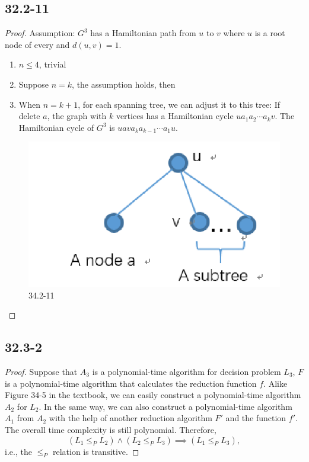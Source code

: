 \documentclass[twocolumn, 10.5pt]{article}
\begin{document}
	\subsection*{32.2-11}
	\begin{proof}
		Assumption: $G^3$ has a Hamiltonian path from $u$ to $v$ where $u$ is a root node of every  and $d(u,v)=1$.\par 
		\begin{enumerate}[(1)]
			\item $n\le 4$, trivial
			\item Suppose $n=k$, the assumption holds, then
			\item When $n=k+1$, for each spanning tree, we can adjust it to this tree: If delete $a$, the graph with $k$ vertices has a Hamiltonian cycle $ua_1a_2\cdots a_kv$. The Hamiltonian cycle of $G^3$ is $uava_ka_{k-1}\cdots a_1u$.
		\end{enumerate} 
	\begin{figure}[H]
		\centering
		\includegraphics[width=0.7\linewidth]{hw2-1}
		\caption{34.2-11}
	\end{figure}
	\end{proof}
	\subsection*{32.3-2}
	\begin{proof}
		Suppose that $A_3$ is a polynomial-time algorithm for decision problem $L_3$, $F$ is a polynomial-time algorithm that calculates the reduction function $f$. Alike Figure 34-5 in the textbook, we can easily construct a polynomial-time algorithm $A_2$ for $L_2$. In the same way, we can also construct a polynomial-time algorithm $A_1$ from $A_2$ with the help of another reduction algorithm $F'$ and the function $f'$. The overall time complexity is still polynomial. Therefore, \[
		\left(L_1\le _PL_2\right)\land\left( L_2\le _PL_3\right)\implies\left(L_1\le _PL_3\right),
		\]
		i.e., the $\le_P$ relation is transitive.
	\end{proof}
\end{document}
